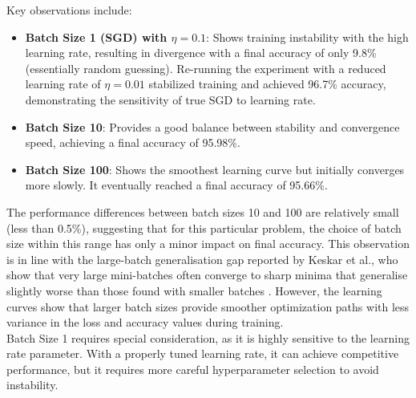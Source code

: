 \documentclass{article}
\begin{document}

\pagebreak

Key observations include:
\begin{itemize}
    \item \textbf{Batch Size 1 (SGD) with $\eta=0.1$}: Shows training instability with the high learning rate, 
    resulting in divergence with a final accuracy of only 9.8\% (essentially random guessing). 
    Re-running the experiment with a reduced learning rate of $\eta=0.01$ stabilized training and 
    achieved 96.7\% accuracy, demonstrating the sensitivity of true SGD to learning rate.
    \item \textbf{Batch Size 10}: Provides a good balance between stability and convergence speed, 
    achieving a final accuracy of 95.98\%.
    \item \textbf{Batch Size 100}: Shows the smoothest learning curve but initially converges more slowly. It eventually reached a final accuracy of 95.66\%.
\end{itemize}

\noindent The performance differences between batch sizes 10 and 100 
are relatively small (less than 0.5\%), suggesting that for this particular problem, the choice of batch 
size within this range has only a minor impact on final accuracy. This observation is in line with 
the large-batch generalisation gap reported by Keskar et al., who show that very large mini-batches 
often converge to sharp minima that generalise slightly worse than those found with smaller 
batches \cite{keskar2017large}. However, the learning curves show that larger batch sizes provide 
smoother optimization paths with less variance in the loss and accuracy values during training. \\

\noindent Batch Size 1 requires special consideration, as it is highly sensitive to the learning rate 
parameter. With a properly tuned learning rate, it can achieve competitive performance, but it 
requires more careful hyperparameter selection to avoid instability. \\
\end{document}
